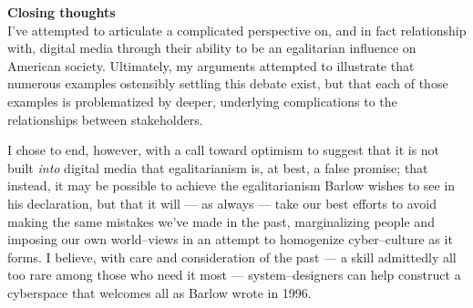 \documentclass[11pt,titlepage]{article}
\newcommand{\sectitle}[1]{\textbf{#1}\\}
\begin{document}
\sectitle{Closing thoughts}
I've attempted to articulate a complicated perspective on,
and in fact relationship with,
digital media through their ability to be an egalitarian influence on American society.
Ultimately, my arguments attempted to illustrate that
numerous examples ostensibly settling this debate exist,
but that each of those examples is problematized by deeper,
underlying complications to the relationships between stakeholders.

I chose to end, however, with a call toward optimism to suggest that
it is not built \textit{into} digital media that egalitarianism is,
at best,
a false promise; that instead,
it may be possible to achieve the egalitarianism Barlow wishes to see in his declaration,
but that it will
--- as always ---
take our best efforts to avoid making the same mistakes we've made in the past,
marginalizing people and imposing our own world--views in an attempt to
homogenize cyber--culture as it forms.
I believe, with care and consideration of the past
--- a skill admittedly all too rare among those who need it most ---
system--designers can help construct a cyberspace that welcomes all as Barlow wrote in 1996.



\end{document}
